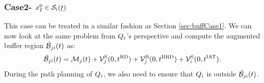 \subsubsection{Case2- $x_{I}^0 \in \mathcal{S}_i(\underline{t})$} \label{sec:buffCase2}
This case can be treated in a similar fashion as Section \ref{sec:buffCase1}. We can now look at the same problem from $Q_i$'s perspective and compute the augmented buffer region $\tilde{\mathcal{B}}_{ji}(t)$ as:
\begin{equation} \label{eqn:augbuffRegion2}
\tilde{\buff}_{ji}(t) = \boset_j(t) + \brs^{\text{S}}_{j}(0, \trd) + \brs^{\text{B}}_{j}(0, \brd) + \brs^{\text{S}}_{i}(0, \iat).
\end{equation}
During the path planning of $Q_i$, we also need to ensure that $Q_i$ is outside $\tilde{\mathcal{B}}_{ji}(t)$. 